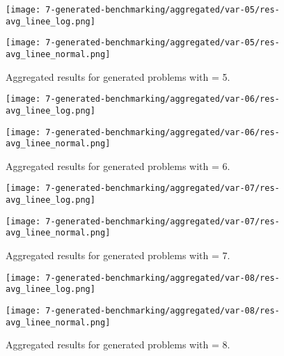 \begin{appendices}
\begin{figure}[H]
  \centering
  \begin{minipage}{1\textwidth}
    \centering
    \texttt{[image: 7-generated-benchmarking/aggregated/var-05/res-avg\_linee\_log.png]}
  \end{minipage}
  \hfill
  \begin{minipage}{1\textwidth}
    \centering
    \texttt{[image: 7-generated-benchmarking/aggregated/var-05/res-avg\_linee\_normal.png]}
  \end{minipage}
  \caption{Aggregated results for generated problems with  = 5.}\label{fig:app-agg-var5}
\end{figure}

\begin{figure}[H]
  \centering
  \begin{minipage}{1\textwidth}
    \centering
    \texttt{[image: 7-generated-benchmarking/aggregated/var-06/res-avg\_linee\_log.png]}
  \end{minipage}
  \hfill
  \begin{minipage}{1\textwidth}
    \centering
    \texttt{[image: 7-generated-benchmarking/aggregated/var-06/res-avg\_linee\_normal.png]}
  \end{minipage}
  \caption{Aggregated results for generated problems with  = 6.}\label{fig:app-agg-var6}
\end{figure}

\begin{figure}[H]
  \centering
  \begin{minipage}{1\textwidth}
    \centering
    \texttt{[image: 7-generated-benchmarking/aggregated/var-07/res-avg\_linee\_log.png]}
  \end{minipage}
  \hfill
  \begin{minipage}{1\textwidth}
    \centering
    \texttt{[image: 7-generated-benchmarking/aggregated/var-07/res-avg\_linee\_normal.png]}
  \end{minipage}
  \caption{Aggregated results for generated problems with  = 7.}\label{fig:app-agg-var7}
\end{figure}

\begin{figure}[H]
  \centering
  \begin{minipage}{1\textwidth}
    \centering
    \texttt{[image: 7-generated-benchmarking/aggregated/var-08/res-avg\_linee\_log.png]}
  \end{minipage}
  \hfill
  \begin{minipage}{1\textwidth}
    \centering
    \texttt{[image: 7-generated-benchmarking/aggregated/var-08/res-avg\_linee\_normal.png]}
  \end{minipage}
  \caption{Aggregated results for generated problems with  = 8.}\label{fig:app-agg-var8}
\end{figure}


\end{appendices}
